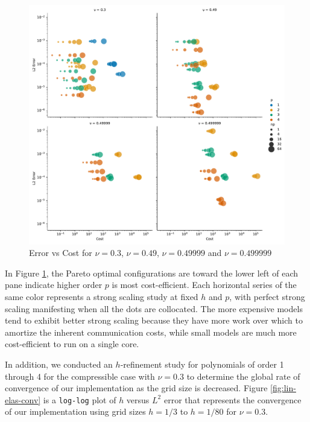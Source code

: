 \begin{figure}[pbt!]
 \begin{center}
      \includegraphics[width=1\textwidth]{../img/error-cost.pdf}
\end{center}
\caption{Error vs Cost for $\nu = 0.3$, $\nu = 0.49$, $\nu = 0.49999$ and $\nu = 0.499999$}
    \label{fig:error-cost}
\end{figure}

In Figure \ref{fig:error-cost}, the Pareto optimal configurations are toward the lower left of each pane indicate higher order $p$ is most cost-efficient.
Each horizontal series of the same color represents a strong scaling study at fixed $h$ and $p$, with perfect strong scaling manifesting when all the dots are collocated.
The more expensive models tend to exhibit better strong scaling because they have more work over which to amortize the inherent communication costs, while small models are much more cost-efficient to run on a single core.

In addition, we conducted an $h$-refinement study for polynomials of order 1 through 4 for the compressible case with $\nu = 0.3$ to determine the global rate of convergence of our implementation as the grid size is decreased.
Figure \ref{fig:lin-elas-conv} is a \texttt{log-log} plot of $h$ versus $L^2$ error that represents the convergence of our implementation using grid sizes $h = 1/3$ to $h = 1/80$ for $\nu = 0.3$.

